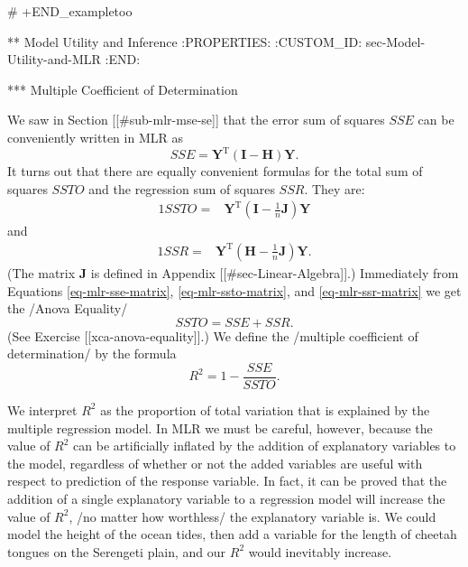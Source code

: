 # +END_exampletoo

** Model Utility and Inference
:PROPERTIES:
:CUSTOM_ID: sec-Model-Utility-and-MLR
:END:

*** Multiple Coefficient of Determination

We saw in Section [[#sub-mlr-mse-se]] that the error sum of squares \(SSE\) can be conveniently written in MLR as 
\begin{equation}
\label{eq-mlr-sse-matrix}
SSE=\mathbf{Y}^{\mathrm{T}}(\mathbf{I}-\mathbf{H})\mathbf{Y}.
\end{equation}
It turns out that there are equally convenient formulas for the total sum of squares \(SSTO\) and the regression sum of squares \(SSR\). They are:
\begin{alignat}{1}
\label{eq-mlr-ssto-matrix}
SSTO= & \mathbf{Y}^{\mathrm{T}}\left(\mathbf{I}-\frac{1}{n}\mathbf{J}\right)\mathbf{Y}
\end{alignat}
and
\begin{alignat}{1}
\label{eq-mlr-ssr-matrix}
SSR= & \mathbf{Y}^{\mathrm{T}}\left(\mathbf{H}-\frac{1}{n}\mathbf{J}\right)\mathbf{Y}.
\end{alignat}
(The matrix \(\mathbf{J}\) is defined in Appendix
[[#sec-Linear-Algebra]].) Immediately from Equations
\eqref{eq-mlr-sse-matrix}, \eqref{eq-mlr-ssto-matrix}, and
\eqref{eq-mlr-ssr-matrix} we get the /Anova Equality/
\begin{equation} 
SSTO=SSE+SSR.
\end{equation}
(See Exercise [[xca-anova-equality]].) We define the /multiple coefficient of determination/ by the formula
\begin{equation} 
R^{2}=1-\frac{SSE}{SSTO}.
\end{equation}

We interpret \(R^{2}\) as the proportion of total variation that is
explained by the multiple regression model. In MLR we must be careful,
however, because the value of \(R^{2}\) can be artificially inflated
by the addition of explanatory variables to the model, regardless of
whether or not the added variables are useful with respect to
prediction of the response variable. In fact, it can be proved that
the addition of a single explanatory variable to a regression model
will increase the value of \(R^{2}\), /no matter how worthless/ the
explanatory variable is. We could model the height of the ocean tides,
then add a variable for the length of cheetah tongues on the Serengeti
plain, and our \(R^{2}\) would inevitably increase.

